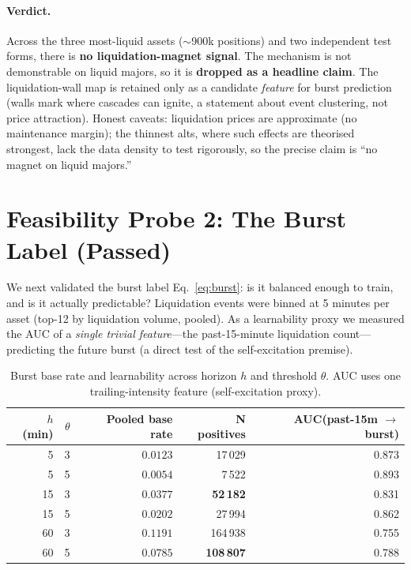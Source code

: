\documentclass[11pt,a4paper]{article}
\begin{document}
\paragraph{Verdict.} Across the three most-liquid assets ($\sim$900k positions) and two independent test forms, there is \textbf{no liquidation-magnet signal}. The mechanism is not demonstrable on liquid majors, so it is \textbf{dropped as a headline claim}. The liquidation-wall map is retained only as a candidate \emph{feature} for burst prediction (walls mark where cascades can ignite, a statement about event clustering, not price attraction). Honest caveats: liquidation prices are approximate (no maintenance margin); the thinnest alts, where such effects are theorised strongest, lack the data density to test rigorously, so the precise claim is ``no magnet on liquid majors.''

\section{Feasibility Probe 2: The Burst Label (Passed)}
\label{sec:m0burst}

We next validated the burst label Eq.~\eqref{eq:burst}: is it balanced enough to train, and is it actually predictable? Liquidation events were binned at 5 minutes per asset (top-12 by liquidation volume, pooled). As a learnability proxy we measured the AUC of a \emph{single trivial feature}---the past-15-minute liquidation count---predicting the future burst (a direct test of the self-excitation premise).

\begin{table}[ht]
\centering
\caption{Burst base rate and learnability across horizon $h$ and threshold $\theta$. AUC uses one trailing-intensity feature (self-excitation proxy).}
\label{tab:burstbase}
\begin{tabular}{rrrrr}
\toprule
$h$ (min) & $\theta$ & Pooled base rate & N positives & AUC(past-15m $\to$ burst) \\
\midrule
5  & 3 & $0.0123$ & 17\,029  & 0.873 \\
5  & 5 & $0.0054$ & 7\,522   & 0.893 \\
15 & 3 & $\mathbf{0.0377}$ & \textbf{52\,182}  & 0.831 \\
15 & 5 & $0.0202$ & 27\,994  & 0.862 \\
60 & 3 & $0.1191$ & 164\,938 & 0.755 \\
60 & 5 & $\mathbf{0.0785}$ & \textbf{108\,807} & 0.788 \\
\bottomrule
\end{tabular}
\end{table}
\end{document}
